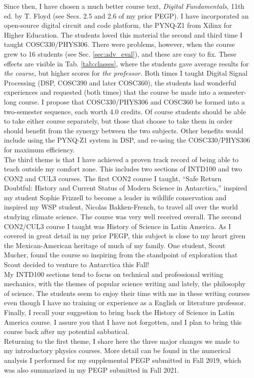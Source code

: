 \documentclass[../../../main.tex]{subfiles}
\begin{document}
Since then, I have chosen a much better course text, \textit{Digital Fundamentals}, 11th ed. by T. Floyd \cite{digitalFund} (see Secs. 2.5 and 2.6 of my prior PEGP).  I have incorporated an open-source digital circuit and code platform, the PYNQ-Z1 from Xilinx for Higher Education.  The students loved this material the second and third time I taught COSC330/PHYS306.  There were problems, however, when the course grew to 16 students (see Sec. \ref{sec:adv_eval}), and these are easy to fix.  These effects are visible in Tab. \ref{tab:classes}, where the students gave average results for \textit{the course,} but higher scores for \textit{the professor.}  Both times I taught Digital Signal Processing (DSP, COSC390 and later COSC360), the students had wonderful experiences and requested (both times) that the course be made into a semester-long course.  I propose that COSC330/PHYS306 and COSC360 be formed into a two-semester sequence, each worth 4.0 credits.  Of course students should be able to take either course separately, but those that choose to take them in order should benefit from the synergy between the two subjects.  Other benefits would include using the PYNQ-Z1 system in DSP, and re-using the COSC330/PHYS306 for maximum efficiency.
\\
\vspace{0.25cm}
The third theme is that I have achieved a proven track record of being able to teach outside my comfort zone.  This includes two sections of INTD100 and two CON2 and CUL3 courses.  The first CON2 course I taught, ``Safe Return Doubtful: History and Current Status of Modern Science in Antarctica,'' inspired my student Sophie Frizzell to become a leader in wildlife conservation and inspired my WSP student, Nicolas Bakken-French, to travel all over the world studying climate science.  The course was very well received overall.  The second CON2/CUL3 course I taught was History of Science in Latin America.  As I covered in great detail in my prior PEGP, this subject is close to my heart given the Mexican-American heritage of much of my family.  One student, Scout Mucher, found the course so inspiring from the standpoint of exploration that Scout decided to venture to Antarctica this Fall!
\\
\vspace{0.25cm}
My INTD100 sections tend to focus on technical and professional writing mechanics, with the themes of popular science writing and lately, the philosophy of science.  The students seem to enjoy their time with me in these writing courses even though I have no training or experience as a English or literature professor.  Finally, I recall your suggestion to bring back the History of Science in Latin America course.  I assure you that I have not forgotten, and I plan to bring this course back after my potential sabbatical.
\\
\vspace{0.25cm}
Returning to the first theme, I share here the three major changes we made to my introductory physics courses.  More detail can be found in the numerical analysis I performed for my supplemental PEGP submitted in Fall 2019, which was also summarized in my PEGP submitted in Fall 2021.
\end{document}
